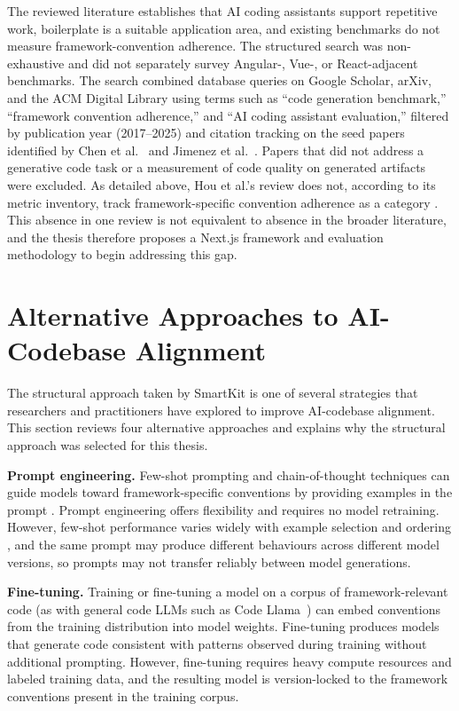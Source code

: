 \documentclass[12pt,a4paper]{report}
\begin{document}
The reviewed literature establishes that AI coding assistants support repetitive work, boilerplate is a suitable application area, and existing benchmarks do not measure framework-convention adherence. The structured search was non-exhaustive and did not separately survey Angular-, Vue-, or React-adjacent benchmarks. The search combined database queries on Google Scholar, arXiv, and the ACM Digital Library using terms such as ``code generation benchmark,'' ``framework convention adherence,'' and ``AI coding assistant evaluation,'' filtered by publication year (2017--2025) and citation tracking on the seed papers identified by Chen et al.~\parencite{chen2021evaluating} and Jimenez et al.~\parencite{jimenez2024swebench}. Papers that did not address a generative code task or a measurement of code quality on generated artifacts were excluded. As detailed above, Hou et al.'s review does not, according to its metric inventory, track framework-specific convention adherence as a category \parencite{hou2024llmse}. This absence in one review is not equivalent to absence in the broader literature, and the thesis therefore proposes a Next.js framework and evaluation methodology to begin addressing this gap.

\section{Alternative Approaches to AI-Codebase Alignment}

The structural approach taken by SmartKit is one of several strategies that researchers and practitioners have explored to improve AI-codebase alignment. This section reviews four alternative approaches and explains why the structural approach was selected for this thesis.

\textbf{Prompt engineering.} Few-shot prompting and chain-of-thought techniques can guide models toward framework-specific conventions by providing examples in the prompt \parencite{openai2024prompting,wei2022chain}. Prompt engineering offers flexibility and requires no model retraining. However, few-shot performance varies widely with example selection and ordering \parencite{brown2020language}, and the same prompt may produce different behaviours across different model versions, so prompts may not transfer reliably between model generations.

\textbf{Fine-tuning.} Training or fine-tuning a model on a corpus of framework-relevant code (as with general code LLMs such as Code Llama~\parencite{roziere2023code}) can embed conventions from the training distribution into model weights. Fine-tuning produces models that generate code consistent with patterns observed during training without additional prompting. However, fine-tuning requires heavy compute resources and labeled training data, and the resulting model is version-locked to the framework conventions present in the training corpus.
\end{document}
